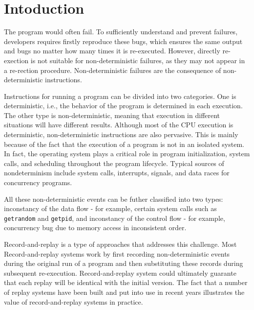 \section{Intoduction}
The program would often fail. To sufficiently understand and prevent failures,
developers requires firstly reproduce these bugs, which ensures the same output
and bugs no matter how many times it is re-executed. However, directly
re-exection is not suitable for non-deterministic failures, as they may not
appear in a re-rection procedure. Non-deterministic failures are the consequence
of non-deterministic instructions. 

Instructions for running a program can be divided into two categories. One is
deterministic, i.e., the behavior of the program is determined in each
execution. The other type is non-deterministic, meaning that execution in
different situations will have different results. Although most of the CPU
execution is deterministic, non-deterministic instructions are also pervasive.
This is mainly because of the fact that the execution of a program is not in an
isolated system. In fact, the operating system plays a critical role in program
initialization, system calls, and scheduling throughout the program lifecycle.
Typical sources of nondeterminism include system calls, interrupts, signals, and
data races for concurrency programs.

All these non-deterministic events can be futher classified into two types:
inconstancy of the data flow - for example, certain system calls such as
\texttt{getrandom} and \texttt{getpid}, and inconstancy of the control flow
- for example, concurrency bug due to memory access in inconsistent order. \cite{getrandom2}

Record-and-replay is a type of approaches that addresses this challenge. Most
Record-and-replay systems work by first recording non-deterministic events
during the original run of a program and then substituting these records during
subsequent re-execution. Record-and-replay system could ultimately guarante that
each replay will be identical with the initial version. The fact that a number
of replay systems have been built and put into use in recent years illustrates
the value of record-and-replay systems in practice.\cite{203227}


